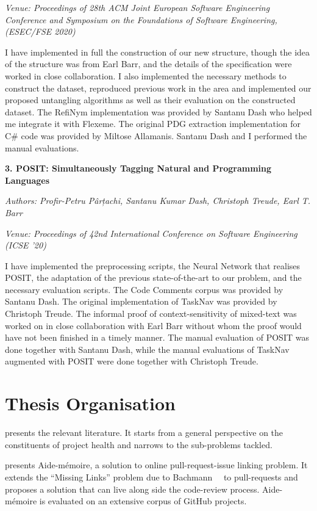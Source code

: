 \noindent\emph{Venue: Proceedings of 28th ACM Joint European Software
Engineering Conference and Symposium on the Foundations of Software Engineering,
(ESEC/FSE 2020)}

\noindent  I have implemented in full the construction of our new structure,
though the idea of the structure was from Earl Barr, and the details of the
specification were worked in close collaboration. I also implemented the
necessary methods to construct the dataset, reproduced previous work in the area
and implemented our proposed untangling algorithms as well as their evaluation
on the constructed dataset. The RefiNym implementation was provided by Santanu
Dash who helped me integrate it with Flexeme. The original PDG extraction
implementation for C\# code was provided by Miltose Allamanis. Santanu Dash and
I performed the manual evaluations.

\noindent\textbf{3. POSIT: Simultaneously Tagging Natural and Programming
Languages} 

\noindent\emph{Authors: Profir-Petru Pârțachi, Santanu Kumar Dash, Christoph
Treude, Earl T. Barr}

\noindent\emph{Venue: Proceedings of 42nd International Conference on Software
Engineering (ICSE ’20)}

\noindent I have implemented the preprocessing scripts, the Neural Network that
realises POSIT, the adaptation of the previous state-of-the-art to our problem,
and the necessary evaluation scripts. The Code Comments corpus was provided by
Santanu Dash. The original implementation of TaskNav was provided by Christoph
Treude. The informal proof of context-sensitivity of mixed-text was worked on in
close collaboration with Earl Barr without whom the proof would have not been
finished in a timely manner. The manual evaluation of POSIT was done together
with Santanu Dash, while the manual evaluations of TaskNav augmented with POSIT
were done together with Christoph Treude.

\section{Thesis Organisation}
\label{chapter:introduction:sec:organisation}

 presents the relevant literature. It starts from a
general perspective on the constituents of project health and narrows to the
sub-problems tackled.

 presents Aide-mémoire, a solution to online pull-request-issue
linking problem. It extends the ``Missing Links'' problem due to
Bachmann~\etal~\cite{MissingLinks} to pull-requests and proposes a solution that
can live along side the code-review process. Aide-mémoire is evaluated on an
extensive corpus of GitHub projects.

